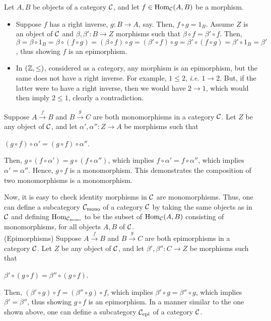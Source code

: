\begin{xca}
Let $A, B$ be objects of a category $\mathcal{C}$, and let $f \in \operatorname{Hom}_{\mathcal{C}}(A,
B)$ be a morphism.
\begin{itemize}
    \item Suppose $f$ has a right inverse, $g: B \to A$, say. Then, $f \circ g
    = 1_B$. Assume $Z$ is an object of $\mathcal{C}$ and $\beta, \beta': B \to Z$
    morphisms such that $\beta \circ f = \beta' \circ f$. Then, $\beta = \beta
    \circ 1_B = \beta \circ (f \circ g) = (\beta \circ f) \circ g = (\beta'
    \circ f) \circ g = \beta' \circ (f \circ g) = \beta' \circ 1_B = \beta'$,
    thus showing $f$ is an epimorphism.
    \item In $(\mathbb{Z}, \le)$, considered as a category, any morphism is an
    epimorphism, but the same does not have a right inverse. For example, $1 \le
    2$, \emph{i.e.} $1 \to 2$. But, if the latter were to have a right inverse,
    then we would have $2 \to 1$, which would then imply $2 \le 1$, clearly a
    contradiction.
\end{itemize}
\end{xca}

\begin{xca}
Suppose $A \xrightarrow{f} B$ and $B \xrightarrow{g} C$ are both monomorphisms
in a category $\mathcal{C}$. Let $Z$ be any object of $\mathcal{C}$, and let $\alpha',
\alpha'': Z \to A$ be morphisms such that
\begin{center}
    $(g \circ f) \circ \alpha' = (g \circ f) \circ \alpha''$.
\end{center}
Then, $g \circ (f \circ \alpha') = g \circ (f \circ \alpha'')$, which implies
$f \circ \alpha' = f \circ \alpha''$, which implies $\alpha' = \alpha''$. Hence,
$g \circ f$ is a monomorphism. This demonstrates the composition of two
monomorphisms is a monomorphism.

Now, it is easy to check identity morphisms in $\mathcal{C}$ are monomorphisms. Thus,
one can define a subcategory $\mathcal{C}_{\text{mono}}$ of a category $\mathcal{C}$ by
taking the same objects as in $\mathcal{C}$ and defining
$\operatorname{Hom}_{\mathcal{C}_{\text{mono}}}$ to be the subset of $\operatorname{Hom}_{\mathcal{C}}(A, B)$
consisting of monomorphisms, for all objects $A, B$ of $\mathcal{C}$.\\

(Epimorphisms) Suppose $A \xrightarrow{f} B$ and $B \xrightarrow{g} C$ are both
epimorphisms in a category $\mathcal{C}$. Let $Z$ be any object of $\mathcal{C}$, and let
$\beta', \beta'': C \to Z$ be morphisms such that
\begin{center}
    $\beta' \circ (g \circ f) = \beta'' \circ (g \circ f)$.
\end{center}
Then, $(\beta' \circ g) \circ f = (\beta'' \circ g) \circ f$, which implies
$\beta' \circ g = \beta'' \circ g$, which implies $\beta' = \beta''$, thus
showing $g \circ f$ is an epimorphism. In a manner similar to the one shown
above, one can define a subcategory $\mathcal{C}_{\text{epi}}$ of a category
$\mathcal{C}$.
\end{xca}
